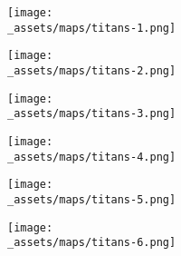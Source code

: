 \begin{minipage}{0.4\paperwidth}
	\centering
	\texttt{[image: \\\_assets/maps/titans-1.png]}
\end{minipage}
\begin{minipage}{0.4\paperwidth}
	\centering
	\texttt{[image: \\\_assets/maps/titans-2.png]}
\end{minipage}
\begin{minipage}{0.4\paperwidth}
	\centering
	\texttt{[image: \\\_assets/maps/titans-3.png]}
\end{minipage}
\begin{minipage}{0.4\paperwidth}
	\centering
	\texttt{[image: \\\_assets/maps/titans-4.png]}
\end{minipage}
\begin{minipage}{0.4\paperwidth}
	\centering
	\texttt{[image: \\\_assets/maps/titans-5.png]}
\end{minipage}
\begin{minipage}{0.4\paperwidth}
	\centering
	\texttt{[image: \\\_assets/maps/titans-6.png]}
\end{minipage}
